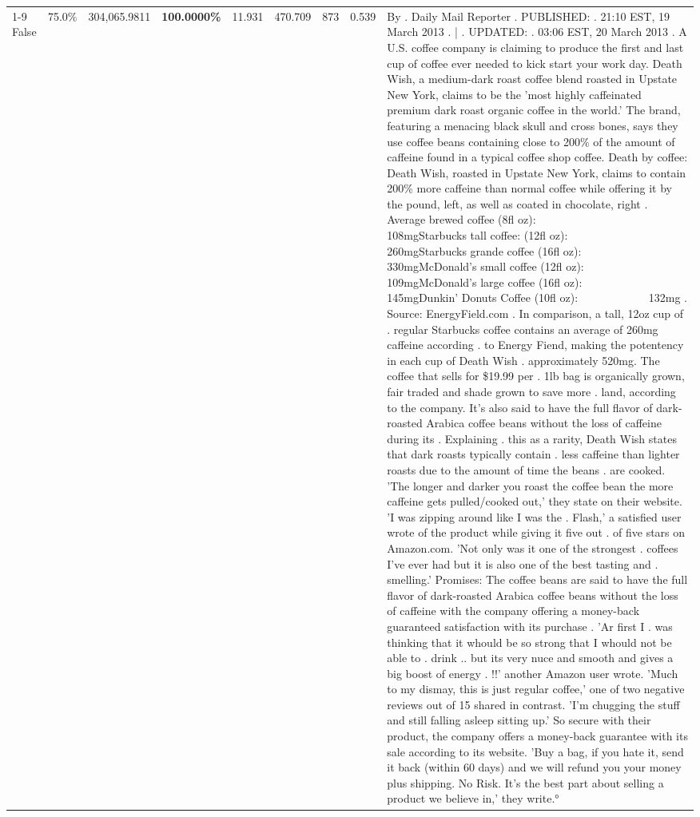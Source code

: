 \begin{table}[H]
{\begin{tabular}{lllrlllll}
\cline{1-9}
False & 75.0\% & 304,065.9811 & \bfseries \color{red} 100.0000\% & 11.931 & 470.709 & 873 & 0.539 & By . Daily Mail Reporter . PUBLISHED: . 21:10 EST, 19 March 2013 . | . UPDATED: . 03:06 EST, 20 March 2013 . A U.S. coffee company is claiming to produce the first and last cup of coffee ever needed to kick start your work day. Death Wish, a medium-dark roast coffee blend roasted in Upstate New York, claims to be the 'most highly caffeinated premium dark roast organic coffee in the world.' The brand, featuring a menacing black skull and cross bones, says they use coffee beans containing close to 200\% of the amount of caffeine found in a typical coffee shop coffee. Death by coffee: Death Wish, roasted in Upstate New York, claims to contain 200\% more caffeine than normal coffee while offering it by the pound, left, as well as coated in chocolate, right . Average brewed coffee (8fl oz):              108mgStarbucks tall coffee: (12fl oz):                260mgStarbucks grande coffee (16fl oz):         330mgMcDonald's small coffee (12fl oz):           109mgMcDonald's large coffee (16fl oz):           145mgDunkin' Donuts Coffee (10fl oz):             132mg . Source: EnergyField.com . In comparison, a tall, 12oz cup of . regular Starbucks coffee contains an average of 260mg caffeine according . to Energy Fiend, making the potentency in each cup of Death Wish . approximately 520mg. The coffee that sells for \$19.99 per . 1lb bag is organically grown, fair traded and shade grown to save more . land, according to the company. It's also said to have the full flavor of dark-roasted Arabica coffee beans without the loss of caffeine during its . Explaining . this as a rarity, Death Wish states that dark roasts typically contain . less caffeine than lighter roasts due to the amount of time the beans . are cooked. 'The longer and darker you roast the coffee bean the more caffeine gets pulled/cooked out,' they state on their website. 'I was zipping around like I was the . Flash,' a satisfied user wrote of the product while giving it five out . of five stars on Amazon.com. 'Not only was it one of the strongest . coffees I've ever had but it is also one of the best tasting and . smelling.’ Promises: The coffee beans are said to have the full flavor of dark-roasted Arabica coffee beans without the loss of caffeine with the company offering a money-back guaranteed satisfaction with its purchase . 'Ar first I . was thinking that it whould be so strong that I whould not be able to . drink .. but its very nuce and smooth and gives a big boost of energy . !!' another Amazon user wrote. 'Much to my dismay, this is just regular coffee,' one of two negative reviews out of 15 shared in contrast. 'I'm chugging the stuff and still falling asleep sitting up.' So secure with their product, the company offers a money-back guarantee with its sale according to its website. 'Buy a bag, if you hate it, send it back (within 60 days) and we will refund you your money plus shipping. No Risk. It’s the best part about selling a product we believe in,' they write.° \\

\end{tabular}}
\end{table}
